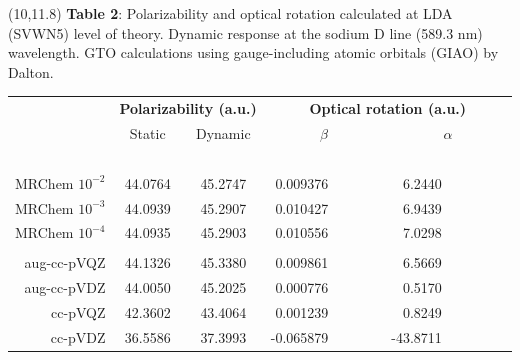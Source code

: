 \documentclass[a0,portrait]{a0poster}
\begin{document}
\begin{textblock}{7}(10,11.8)
\footnotesize
\textbf{Table 2}: Polarizability and optical rotation calculated at LDA (SVWN5) 
level of theory. Dynamic response at the sodium D line (589.3 nm) wavelength.
GTO calculations using gauge-including atomic orbitals (GIAO) by Dalton\cite{Dalton}.
\begin{table}
    \normalsize
    \centering
    \begin{tabular}{|r|cc|rr|}
	\hline&
        \multicolumn{2}{c|}{\textbf{Polarizability (a.u.)}}&
        \multicolumn{2}{c|}{\textbf{Optical rotation (a.u.)}}\\
                         & Static        & Dynamic       &
                         \multicolumn{1}{c}{$\beta$}&
                         \multicolumn{1}{c|}{$\alpha$}\\
	\hline
	\hspace{55mm}\   &\hspace{62mm}\ &\hspace{62mm}\ &\hspace{62mm}\ &\hspace{62mm}\ \\
	MRChem $10^{-2}$ & 44.0764       & 45.2747       & 0.009376\ \ \ \ \ \ \ &   6.2440\ \ \ \ \ \ \ \ \ \\
	MRChem $10^{-3}$ & 44.0939       & 45.2907       & 0.010427\ \ \ \ \ \ \ &   6.9439\ \ \ \ \ \ \ \ \ \\
	MRChem $10^{-4}$ & 44.0935       & 45.2903       & 0.010556\ \ \ \ \ \ \ &   7.0298\ \ \ \ \ \ \ \ \ \\
	                 &               &               &                       &                           \\
	aug-cc-pVQZ      & 44.1326       & 45.3380       & 0.009861\ \ \ \ \ \ \ &   6.5669\ \ \ \ \ \ \ \ \ \\
	aug-cc-pVDZ      & 44.0050       & 45.2025       & 0.000776\ \ \ \ \ \ \ &   0.5170\ \ \ \ \ \ \ \ \ \\
	    cc-pVQZ      & 42.3602       & 43.4064       & 0.001239\ \ \ \ \ \ \ &   0.8249\ \ \ \ \ \ \ \ \ \\
	    cc-pVDZ      & 36.5586       & 37.3993       &-0.065879\ \ \ \ \ \ \ & -43.8711\ \ \ \ \ \ \ \ \ \\

\end{tabular}
\end{table}
\end{textblock}
\end{document}
